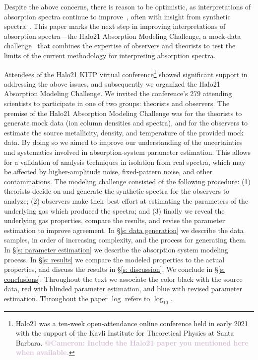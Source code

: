 \documentclass[fleqn,usenatbib]{mnras}
\makeatletter
\newcommand{\atcameron}[1]{\textcolor{Thistle}{\textbf{@Cameron: #1}}}
\makeatother
\begin{document}
Despite the above concerns, there is reason to be optimistic,
as interpretations of absorption spectra continue to improve~\citep[e.g.][]{churchill2015Direct, sameer2021Cloudbycloud}, often with insight from synthetic spectra~\citep[e.g.][]{hummels2013Constraints, liang2018Observing}.
This paper marks the next step in improving interpretations of absorption spectra---the Halo21 Absorption Modeling Challenge, a mock-data challenge~\citep[e.g.][]{regimbau2012Mock, meacher2015Mock, hazboun2019Second} that combines the expertise of observers and theorists to test the limits of the current methodology for interpreting absorption spectra.

Attendees of the Halo21 KITP virtual conference\footnote{Halo21 was a ten-week open-attendance online conference held in early 2021 with the support of the Kavli Institute for Theoretical Physics at Santa Barbara. \atcameron{Include the Halo21 paper you mentioned here when available.}}
showed significant support in addressing the above issues, and subsequently we organized the Halo21 Absorption Modeling Challenge.
We invited the conference's 279 attending scientists to participate in one of two groups:
theorists and observers.
The premise of the Halo21 Absorption Modeling Challenge was for the theorists to generate mock data (ion column densities and spectra), and for the observers to estimate the source metallicity, density, and temperature of the provided mock data.
By doing so we aimed to improve our understanding of the uncertainties and systematics involved in absorption-system parameter estimation.
This allows for a validation of analysis techniques in isolation from real spectra,
which may be affected by higher-amplitude noise, fixed-pattern noise, and other contaminations.
The modeling challenge consisted of the following procedure:
(1) theorists decide on and generate the synthetic spectra for the observers to analyze; (2) observers make their best effort at estimating the parameters of the underlying gas which produced the spectra; and (3) finally we reveal the underlying gas properties, compare the results, and revise the parameter estimation to improve agreement.
In \S\ref{s: data generation} we describe the data samples, in order of increasing complexity, and the process for generating them.
In \S\ref{s:  parameter estimation} we describe the absorption system modeling process.
In \S\ref{s: results} we compare the modeled properties to the actual properties, and discuss the results in \S\ref{s: discussion}.
We conclude in \S\ref{s: conclusions}.
Throughout the text we associate the color black with the source data,
red with blinded parameter estimation,
and blue with revised parameter estimation.
Throughout the paper $\log$ refers to $\log_{10}$.
\end{document}
